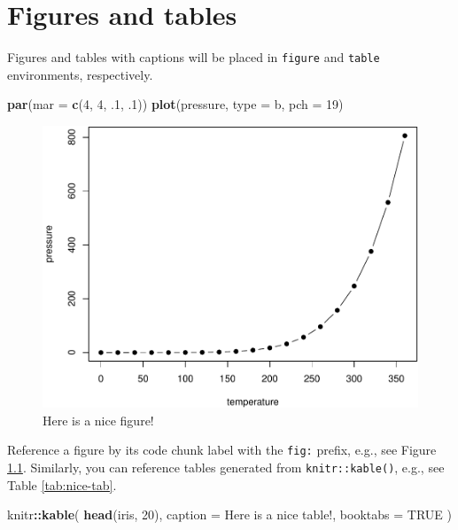 \documentclass[
]{book}
\newenvironment{Shaded}{\begin{snugshade}}{\end{snugshade}}
\newcommand{\AttributeTok}[1]{\textcolor[rgb]{0.13,0.29,0.53}{#1}}
\newcommand{\ConstantTok}[1]{\textcolor[rgb]{0.56,0.35,0.01}{#1}}
\newcommand{\DecValTok}[1]{\textcolor[rgb]{0.00,0.00,0.81}{#1}}
\newcommand{\FunctionTok}[1]{\textcolor[rgb]{0.13,0.29,0.53}{\textbf{#1}}}
\newcommand{\NormalTok}[1]{#1}
\newcommand{\SpecialCharTok}[1]{\textcolor[rgb]{0.81,0.36,0.00}{\textbf{#1}}}
\newcommand{\StringTok}[1]{\textcolor[rgb]{0.31,0.60,0.02}{#1}}
\begin{document}
\chapter{Figures and tables}\label{figtab}

Figures and tables with captions will be placed in \texttt{figure} and \texttt{table} environments, respectively.

\begin{Shaded}
\begin{Highlighting}[]
\FunctionTok{par}\NormalTok{(}\AttributeTok{mar =} \FunctionTok{c}\NormalTok{(}\DecValTok{4}\NormalTok{, }\DecValTok{4}\NormalTok{, .}\DecValTok{1}\NormalTok{, .}\DecValTok{1}\NormalTok{))}
\FunctionTok{plot}\NormalTok{(pressure, }\AttributeTok{type =} \StringTok{\textquotesingle{}b\textquotesingle{}}\NormalTok{, }\AttributeTok{pch =} \DecValTok{19}\NormalTok{)}
\end{Highlighting}
\end{Shaded}

\begin{figure}

{\centering \includegraphics[width=0.8\linewidth]{SkalanesFlora_files/figure-latex/nice-fig-1} 

}

\caption{Here is a nice figure!}\label{fig:nice-fig}
\end{figure}

Reference a figure by its code chunk label with the \texttt{fig:} prefix, e.g., see Figure \ref{fig:nice-fig}. Similarly, you can reference tables generated from \texttt{knitr::kable()}, e.g., see Table \ref{tab:nice-tab}.

\begin{Shaded}
\begin{Highlighting}[]
\NormalTok{knitr}\SpecialCharTok{::}\FunctionTok{kable}\NormalTok{(}
  \FunctionTok{head}\NormalTok{(iris, }\DecValTok{20}\NormalTok{), }\AttributeTok{caption =} \StringTok{\textquotesingle{}Here is a nice table!\textquotesingle{}}\NormalTok{,}
  \AttributeTok{booktabs =} \ConstantTok{TRUE}
\NormalTok{)}
\end{Highlighting}
\end{Shaded}
\end{document}
